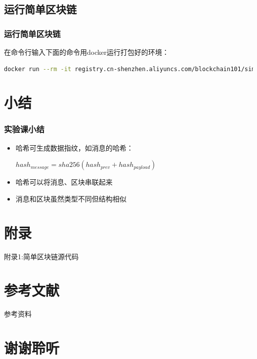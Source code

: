 \documentclass[11pt]{beamer}
\begin{document}
\subsection{运行简单区块链}

\begin{frame}[fragile]
	\frametitle{运行简单区块链}
在命令行输入下面的命令用docker运行打包好的环境：
		\begin{lstlisting}[language=sh,numbers=none,basicstyle=\fontsize{6}{7}\ttfamily]
docker run --rm -it registry.cn-shenzhen.aliyuncs.com/blockchain101/simpleblockcha1
\end{lstlisting}
\end{frame}

\section*{小结}
\begin{frame}
	\frametitle{实验课小结}
	\begin{itemize}
		\item 哈希可生成数据指纹，如消息的哈希：
		
		$hash_{message}=sha256(hash_{prev} + hash_{payload})$
		
		\item 哈希可以将消息、区块串联起来
		
		\item 消息和区块虽然类型不同但结构相似
	\end{itemize}
\end{frame}

\section*{附录}
\begin{frame}[allowframebreaks]{附录1:简单区块链源代码}
	
\end{frame}

\section*{参考文献}
\begin{frame}{参考资料}
	
	
\end{frame}

\section*{谢谢聆听}
\end{document}
